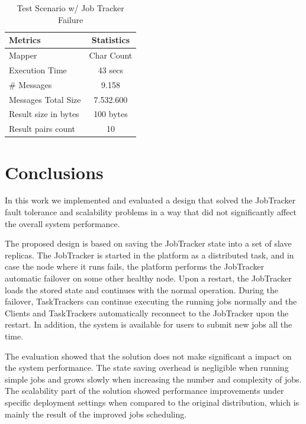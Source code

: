 \documentclass[times, 10pt,twocolumn]{article}
\begin{document}
    \begin{table}
        \centering
        \label{eval2}
        \caption{Test Scenario w/ Job Tracker Failure}
        \begin{tabular}{l | c}
            \toprule
            Metrics & Statistics\\
            \midrule
            Mapper & Char Count \\ 
            Execution Time & 43 secs \\ 
            \# Messages & 9.158 \\ 
            Messages Total Size & 7.532.600 \\ 
            Result size in bytes & 100 bytes \\
            Result pairs count & 10 \\
            \bottomrule
            \end{tabular} 
            \end{table}
    
	\section{Conclusions}

    In this work we implemented and evaluated a design that solved the JobTracker fault tolerance and scalability problems in a way that did not significantly affect the overall system performance.
    
    The proposed design is based on saving the JobTracker state into a set of slave replicas. The JobTracker is started in the platform as a distributed task, and in case the node where it runs fails, the platform performs the JobTracker automatic failover on some other healthy node. Upon a restart, the JobTracker loads the stored state and continues with the normal operation. During the failover, TaskTrackers can continue executing the running jobs normally and the Clients and TaskTrackers automatically reconnect to the JobTracker upon the restart. In addition, the system is available for users to submit new jobs all the time.
    
    The evaluation showed that the solution does not make significant a impact on the system performance. The state saving overhead is negligible when running simple jobs and grows slowly when increasing the number and complexity of jobs. The scalability part of the solution showed performance improvements under specific deployment settings when compared to the original distribution, which is mainly the result of the improved jobs scheduling.

	
	
\end{document}

